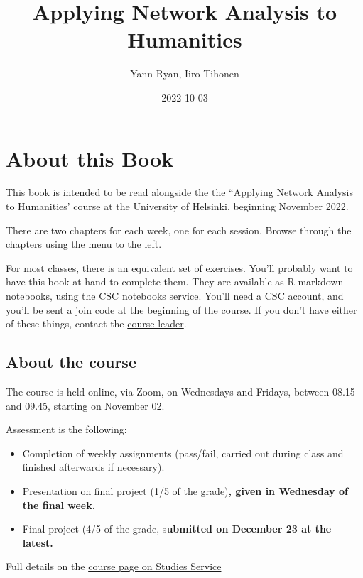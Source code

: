 \documentclass[
]{book}
\title{Applying Network Analysis to Humanities}
\author{Yann Ryan, Iiro Tihonen}
\date{2022-10-03}
\begin{document}
\maketitle

{
\setcounter{tocdepth}{1}
\tableofcontents
}
\hypertarget{about-this-book}{%
\chapter{About this Book}\label{about-this-book}}

This book is intended to be read alongside the the ``Applying Network
Analysis to Humanities' course at the University of Helsinki, beginning
November 2022.

There are two chapters for each week, one for each session. Browse
through the chapters using the menu to the left.

For most classes, there is an equivalent set of exercises. You'll
probably want to have this book at hand to complete them. They are
available as R markdown notebooks, using the CSC notebooks service.
You'll need a CSC account, and you'll be sent a join code at the
beginning of the course. If you don't have either of these things,
contact the \href{mailto:yann.ryan@helinki.fi}{course leader}.

\hypertarget{about-the-course}{%
\section{About the course}\label{about-the-course}}

The course is held online, via Zoom, on Wednesdays and Fridays, between
08.15 and 09.45, starting on November 02.

Assessment is the following:

\begin{itemize}
\item
  Completion of weekly assignments (pass/fail, carried out during
  class and finished afterwards if necessary).
\item
  Presentation on final project (1/5 of the grade)\textbf{, given in
  Wednesday of the final week.}
\item
  Final project (4/5 of the grade, s\textbf{ubmitted on December 23 at the
  latest.}
\end{itemize}

Full details on the \href{https://studies.helsinki.fi/courses/cur/hy-opt-cur-2223-7c9cdedc-fc7b-4e66-b793-1dbe0db868b7}{course page on Studies
Service}
\end{document}
